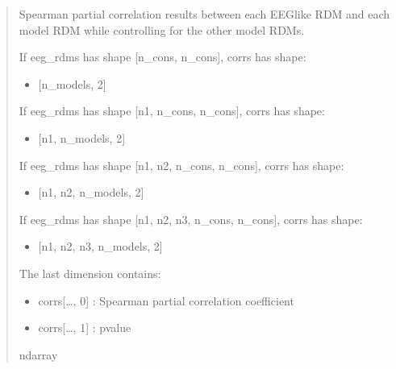 \documentclass[letterpaper,10pt,english]{sphinxhowto}
\begin{document}
\begin{fulllineitems}
\begin{quote}
\begin{description}
\begin{itemize}
\end{itemize}

\sphinxAtStartPar

\sphinxAtStartPar
{} \textendash{} Spearman partial correlation results between each EEG\sphinxhyphen{}like RDM and
each model RDM while controlling for the other model RDMs.

\sphinxAtStartPar
If eeg\_rdms has shape {[}n\_cons, n\_cons{]}, corrs has shape:
\begin{itemize}
\item {} 
\sphinxAtStartPar
{[}n\_models, 2{]}

\end{itemize}

\sphinxAtStartPar
If eeg\_rdms has shape {[}n1, n\_cons, n\_cons{]}, corrs has shape:
\begin{itemize}
\item {} 
\sphinxAtStartPar
{[}n1, n\_models, 2{]}

\end{itemize}

\sphinxAtStartPar
If eeg\_rdms has shape {[}n1, n2, n\_cons, n\_cons{]}, corrs has shape:
\begin{itemize}
\item {} 
\sphinxAtStartPar
{[}n1, n2, n\_models, 2{]}

\end{itemize}

\sphinxAtStartPar
If eeg\_rdms has shape {[}n1, n2, n3, n\_cons, n\_cons{]}, corrs has shape:
\begin{itemize}
\item {} 
\sphinxAtStartPar
{[}n1, n2, n3, n\_models, 2{]}

\end{itemize}

\sphinxAtStartPar
The last dimension contains:
\begin{itemize}
\item {} 
\sphinxAtStartPar
corrs{[}…, 0{]} : Spearman partial correlation coefficient

\item {} 
\sphinxAtStartPar
corrs{[}…, 1{]} : p\sphinxhyphen{}value

\end{itemize}


\sphinxAtStartPar
ndarray

\end{description}\end{quote}

\end{fulllineitems}
\end{document}
